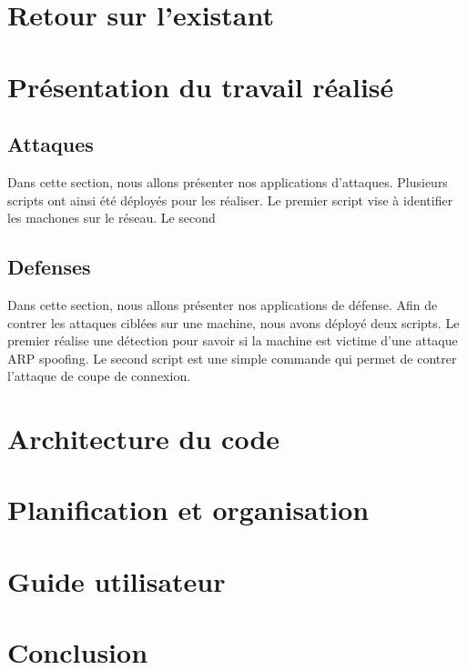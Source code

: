 \documentclass[11pt]{article}
\begin{document}
\section{Retour sur l'existant}



\section{Présentation du travail réalisé}

\subsection{Attaques}

Dans cette section, nous allons présenter nos applications d'attaques. Plusieurs scripts ont ainsi été déployés pour les réaliser. Le premier script vise à identifier les machones sur le réseau.
Le second 

\subsection{Defenses}

Dans cette section, nous allons présenter nos applications de défense.
Afin de contrer les attaques ciblées sur une machine, nous avons déployé deux scripts. Le premier réalise une détection pour savoir si la machine est victime d'une attaque ARP spoofing. Le second script est une simple commande qui permet de contrer l'attaque de coupe de connexion.


\section{Architecture du code}
\section{Planification et organisation}
\section{Guide utilisateur}

\section{Conclusion}

\newpage
\listoffigures
\end{document}

